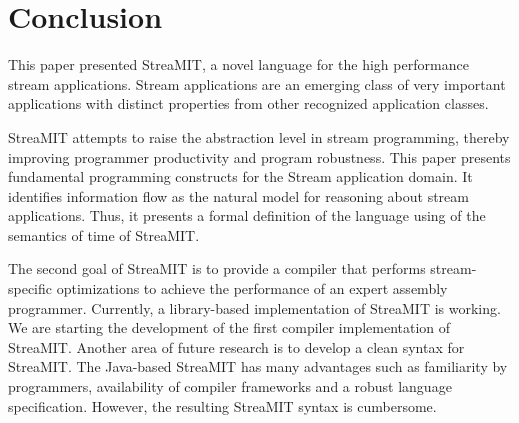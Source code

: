 \section{Conclusion}
\label{sec:conc}
This paper presented StreaMIT, a novel language for the high
performance stream applications.
Stream applications are an emerging class of very important
applications with distinct properties from other recognized
application classes.

StreaMIT attempts to raise the abstraction level in stream
programming, thereby improving programmer productivity and program
robustness. This paper presents fundamental programming constructs
for the Stream application domain. It identifies information flow as
the natural model for reasoning about stream applications. Thus, it
presents a formal definition of the language using of the semantics of
time of StreaMIT. 

The second goal of StreaMIT is to provide a compiler that performs
stream-specific optimizations to achieve the performance of an expert
assembly programmer. Currently, a library-based implementation of
StreaMIT is working. We are starting the development of the first
compiler implementation of StreaMIT. Another area of future research
is to develop a clean syntax for StreaMIT. The Java-based StreaMIT has
many advantages such as familiarity by programmers, availability of
compiler frameworks and a robust language specification. However, the
resulting StreaMIT syntax is cumbersome.

